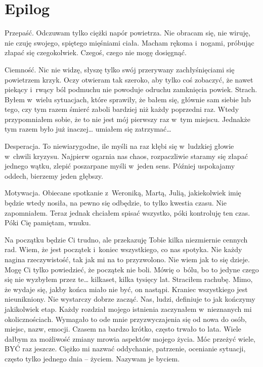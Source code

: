\chapter{Epilog}

Przepaść. Odczuwam tylko ciężki napór powietrza. Nie obracam się, nie wiruję, nie czuję swojego, spiętego mięśniami ciała. Macham rękoma i~nogami, próbując złapać się czegokolwiek. Czegoś, czego nie mogę dosięgnąć.

Ciemność. Nic nie widzę, słyszę tylko swój przerywany zachłyśnięciami się powietrzem krzyk. Oczy otwieram tak szeroko, aby tylko coś zobaczyć, że nawet piekący i~rwący ból podmuchu nie powoduje odruchu zamknięcia powiek.
Strach. Byłem w~wielu sytuacjach, które sprawiły, że bałem się, głównie sam siebie lub tego, czy tym razem śmierć zaboli bardziej niż każdy poprzedni raz. Wtedy przypomniałem sobie, że to nie jest mój pierwszy raz w~tym miejscu. Jednakże tym razem było już inaczej… umiałem się zatrzymać…

Desperacja. To niewiarygodne, ile myśli na raz kłębi się w~ludzkiej głowie w~chwili kryzysu. Najpierw ogarnia nas chaos, rozpaczliwie staramy się złapać jednego wątku, zlepić poszarpane myśli w~jeden sens. Później uspokajamy oddech, bierzemy jeden głębszy.

Motywacja. Obiecane spotkanie z~Weroniką, Martą, Julią, jakiekolwiek imię będzie wtedy nosiła, na pewno się odbędzie, to tylko kwestia czasu. Nie zapomniałem. Teraz jednak chciałem spisać wszystko, póki kontroluję ten czas. Póki Cię pamiętam, wnuku.

\paraSep

Na początku będzie Ci trudno, ale przekazuję Tobie kilka niezmiernie cennych rad. Wiem, że jest początek i~koniec wszystkiego, co nas spotyka. Nie każdy nagina rzeczywistość, tak jak mi na to przyzwolono. Nie wiem jak to się dzieje. Mogę Ci tylko powiedzieć, że początek nie boli. Mówię o~bólu, bo to jedyne czego się nie wyzbyłem przez te… kilkaset, kilka tysięcy lat. Straciłem rachubę. Mimo, że wydaje się, jakby końca miało nie być, on nastąpi. Kraniec wszystkiego jest nieunikniony. Nie wystarczy dobrze zacząć. Nas, ludzi, definiuje to jak kończymy jakikolwiek etap. Każdy rozdział mojego istnienia zaczynałem w~nieznanych mi okolicznościach. Wymagało to ode mnie przyzwyczajenia się od nowa do osób, miejsc, nazw, emocji. Czasem na bardzo krótko, często trwało to lata. Wiele dałbym za możliwość zmiany mrowia aspektów mojego życia. Móc przeżyć wiele, BYĆ raz jeszcze. Ciężko mi nazwać oddychanie, patrzenie, ocenianie sytuacji, często tylko jednego dnia -- życiem. Nazywam je byciem.

